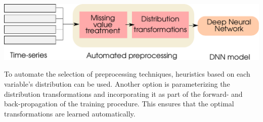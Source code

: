 \documentclass[portrait,final,x11names,a1paper,fontscale=0.4]{baposter}
\newcommand{\icl}[1]{{\bf\color{blue_icl2}{#1}}}
\begin{document}
\begin{poster}
{\noindent
\includegraphics[width=\textwidth]{Figures/automated-preprocessing-diagram.pdf} 

\noindent
To automate the selection of preprocessing techniques, heuristics based on each
variable's distribution can be used. Another option is parameterizing the distribution
transformations and incorporating it as part of the forward- and back-propagation of the
training procedure. This ensures that the optimal transformations are learned automatically.
}


\end{poster}
\end{document}
